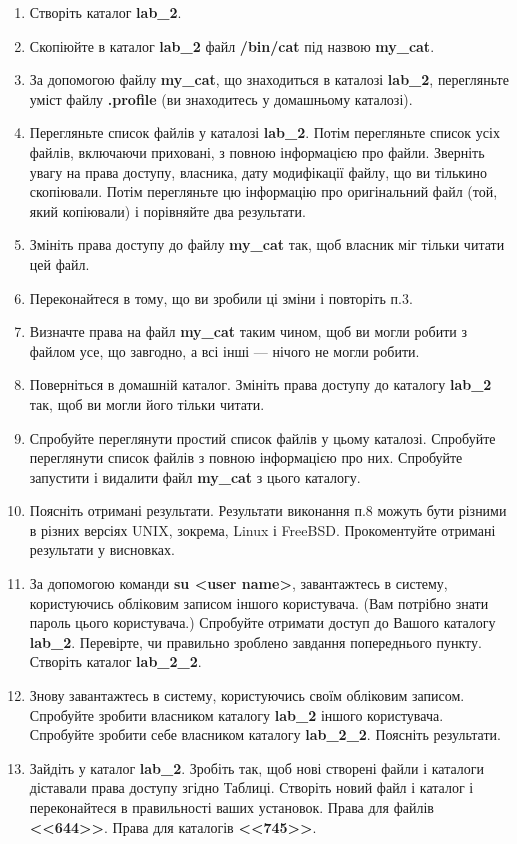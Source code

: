 \documentclass[a4paper,12pt]{article}
\begin{document}
    \begin{enumerate}
        \item Створіть каталог \textbf{lab\_2}.
        \item Скопіюйте в каталог \textbf{lab\_2} файл \textbf{/bin/cat} під назвою \textbf{my\_cat}.
        \item За допомогою файлу \textbf{my\_cat}, що знаходиться в каталозі \textbf{lab\_2}, перегляньте уміст файлу \textbf{.profile} (ви знаходитесь у домашньому каталозі).
        \item Перегляньте список файлів у каталозі \textbf{lab\_2}. Потім перегляньте список усіх файлів, включаючи приховані, з
        повною інформацією про файли. Зверніть увагу на права доступу, власника, дату модифікації файлу, що ви тількино скопіювали. 
        Потім перегляньте цю інформацію про оригінальний файл (той, який копіювали) і порівняйте два результати.
        \item Змініть права доступу до файлу \textbf{my\_cat} так, щоб власник міг тільки читати цей файл.
        \item Переконайтеся в тому, що ви зробили ці зміни і повторіть п.3.
        \item Визначте права на файл \textbf{my\_cat} таким чином, щоб ви могли робити з файлом усе, що завгодно, а всі інші — нічого не могли робити.
        \item Поверніться в домашній каталог. Змініть права доступу до каталогу \textbf{lab\_2} так, щоб ви могли його тільки читати.
        \item Спробуйте переглянути простий список файлів у цьому каталозі. Спробуйте переглянути список файлів з повною інформацією про них. Спробуйте запустити і видалити
        файл \textbf{my\_cat} з цього каталогу.
        \item Поясніть отримані результати. Результати виконання п.8 можуть бути різними в різних версіях UNIX, зокрема, Linux і FreeBSD. Прокоментуйте отримані результати у
        висновках.
        \item За допомогою команди \textbf{su <user name>}, завантажтесь в систему, користуючись обліковим записом іншого користувача. (Вам потрібно знати пароль цього
        користувача.) Спробуйте отримати доступ до Вашого каталогу \textbf{lab\_2}. Перевірте, чи правильно зроблено завдання попереднього пункту. Створіть каталог \textbf{lab\_2\_2}.
        \item Знову завантажтесь в систему, користуючись своїм обліковим записом. Спробуйте зробити власником каталогу \textbf{lab\_2} іншого користувача. Спробуйте зробити 
        себе власником каталогу \textbf{lab\_2\_2}. Поясніть результати.
        \item Зайдіть у каталог \textbf{lab\_2}. Зробіть так, щоб нові створені файли і каталоги діставали права доступу згідно Таблиці. Створіть новий файл і каталог і переконайтеся в
        правильності ваших установок. Права для файлів \textbf{<<644>>}. Права для каталогів \textbf{<<745>>}.
    \end{enumerate}
\end{document}
